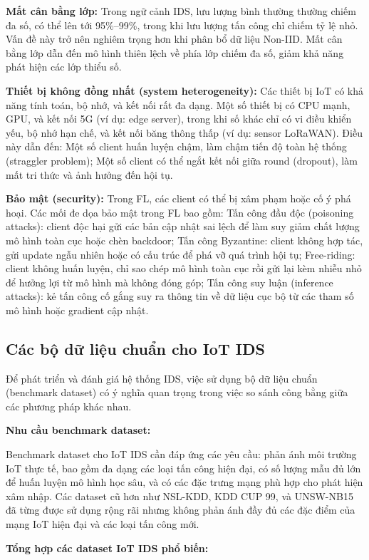 \textbf{Mất cân bằng lớp:} Trong ngữ cảnh IDS, lưu lượng bình thường thường chiếm đa số, có thể lên tới 95\%--99\%, trong khi lưu lượng tấn công chỉ chiếm tỷ lệ nhỏ. Vấn đề này trở nên nghiêm trọng hơn khi phân bổ dữ liệu Non-IID. Mất cân bằng lớp dẫn đến mô hình thiên lệch về phía lớp chiếm đa số, giảm khả năng phát hiện các lớp thiểu số.

\textbf{Thiết bị không đồng nhất (system heterogeneity):} Các thiết bị IoT có khả năng tính toán, bộ nhớ, và kết nối rất đa dạng. Một số thiết bị có CPU mạnh, GPU, và kết nối 5G (ví dụ: edge server), trong khi số khác chỉ có vi điều khiển yếu, bộ nhớ hạn chế, và kết nối băng thông thấp (ví dụ: sensor LoRaWAN). Điều này dẫn đến: Một số client huấn luyện chậm, làm chậm tiến độ toàn hệ thống (straggler problem); Một số client có thể ngắt kết nối giữa round (dropout), làm mất tri thức và ảnh hưởng đến hội tụ.

\textbf{Bảo mật (security):} Trong FL, các client có thể bị xâm phạm hoặc cố ý phá hoại. Các mối đe dọa bảo mật trong FL bao gồm: Tấn công đầu độc (poisoning attacks): client độc hại gửi các bản cập nhật sai lệch để làm suy giảm chất lượng mô hình toàn cục hoặc chèn backdoor; Tấn công Byzantine: client không hợp tác, gửi update ngẫu nhiên hoặc có cấu trúc để phá vỡ quá trình hội tụ; Free-riding: client không huấn luyện, chỉ sao chép mô hình toàn cục rồi gửi lại kèm nhiễu nhỏ để hưởng lợi từ mô hình mà không đóng góp; Tấn công suy luận (inference attacks): kẻ tấn công cố gắng suy ra thông tin về dữ liệu cục bộ từ các tham số mô hình hoặc gradient cập nhật.

\subsection{Các bộ dữ liệu chuẩn cho IoT IDS}
Để phát triển và đánh giá hệ thống IDS, việc sử dụng bộ dữ liệu chuẩn (benchmark dataset) có ý nghĩa quan trọng trong việc so sánh công bằng giữa các phương pháp khác nhau.

\textbf{Nhu cầu benchmark dataset:}

Benchmark dataset cho IoT IDS cần đáp ứng các yêu cầu: phản ánh môi trường IoT thực tế, bao gồm đa dạng các loại tấn công hiện đại, có số lượng mẫu đủ lớn để huấn luyện mô hình học sâu, và có các đặc trưng mạng phù hợp cho phát hiện xâm nhập. Các dataset cũ hơn như NSL-KDD, KDD CUP 99, và UNSW-NB15 đã từng được sử dụng rộng rãi nhưng không phản ánh đầy đủ các đặc điểm của mạng IoT hiện đại và các loại tấn công mới.

\textbf{Tổng hợp các dataset IoT IDS phổ biến:}

